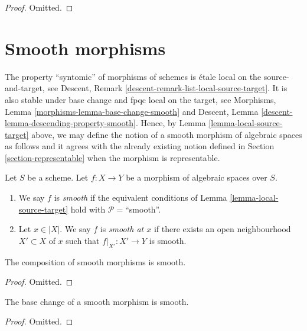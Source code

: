 \begin{proof}
Omitted.
\end{proof}






\section{Smooth morphisms}
\label{section-smooth}

\noindent
The property ``syntomic'' of morphisms of schemes is
\'etale local on the source-and-target, see
Descent, Remark \ref{descent-remark-list-local-source-target}.
It is also stable under base change and fpqc local on the target, see
Morphisms, Lemma \ref{morphisms-lemma-base-change-smooth}
and
Descent, Lemma \ref{descent-lemma-descending-property-smooth}.
Hence, by
Lemma \ref{lemma-local-source-target}
above, we may define the notion of a smooth morphism of algebraic spaces as
follows and it agrees with the already existing notion defined in
Section \ref{section-representable}
when the morphism is representable.

\begin{definition}
\label{definition-smooth}
Let $S$ be a scheme.
Let $f : X \to Y$ be a morphism of algebraic spaces over $S$.
\begin{enumerate}
\item We say $f$ is {\it smooth} if the equivalent conditions of
Lemma \ref{lemma-local-source-target} hold with
$\mathcal{P} =$``smooth''.
\item Let $x \in |X|$. We say $f$ is {\it smooth at $x$} if there exists
an open neighbourhood $X' \subset X$ of $x$ such that $f|_{X'} : X' \to Y$
is smooth.
\end{enumerate}
\end{definition}

\begin{lemma}
\label{lemma-composition-smooth}
The composition of smooth morphisms is smooth.
\end{lemma}

\begin{proof}
Omitted.
\end{proof}

\begin{lemma}
\label{lemma-base-change-smooth}
The base change of a smooth morphism is smooth.
\end{lemma}

\begin{proof}
Omitted.
\end{proof}

